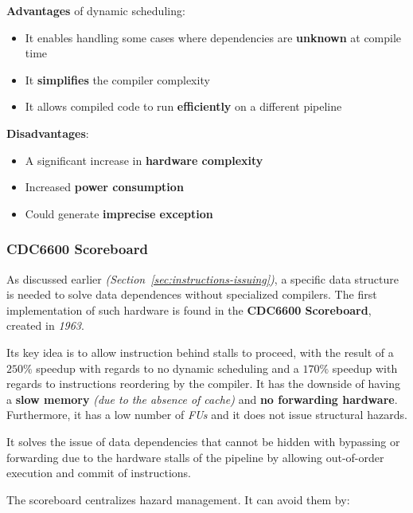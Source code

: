 \documentclass[english]{article}
\begin{document}
\bigskip
\textbf{Advantages} of dynamic scheduling:
\begin{itemize}
  \item It enables handling some cases where dependencies are \textbf{unknown} at compile time
  \item It \textbf{simplifies} the compiler complexity
  \item It allows compiled code to run \textbf{efficiently} on a different pipeline
\end{itemize}

\textbf{Disadvantages}:
\begin{itemize}
  \item A significant increase in \textbf{hardware complexity}
  \item Increased \textbf{power consumption}
  \item Could generate \textbf{imprecise exception}
\end{itemize}

\subsubsection{CDC6600 Scoreboard}
\label{par:CDC6600-scoreboard}

As discussed earlier \textit{(Section~\ref{sec:instructions-issuing})}, a specific data structure is needed to solve data dependences without specialized compilers.
The first implementation of such hardware is found in the \textbf{CDC6600 Scoreboard}, created in \textit{1963}.

Its key idea is to allow instruction behind stalls to proceed, with the result of a \(250\%\) speedup with regards to no dynamic scheduling and a \(170\%\) speedup with regards to instructions reordering by the compiler.
It has the downside of having a \textbf{slow memory} \textit{(due to the absence of cache)} and \textbf{no forwarding hardware}.
Furthermore, it has a low number of \textit{FUs} and it does not issue structural hazards.

It solves the issue of data dependencies that cannot be hidden with bypassing or forwarding due to the hardware stalls of the pipeline by allowing out-of-order execution and commit of instructions.

\bigskip
The scoreboard centralizes hazard management.
It can avoid them by:
\end{document}
